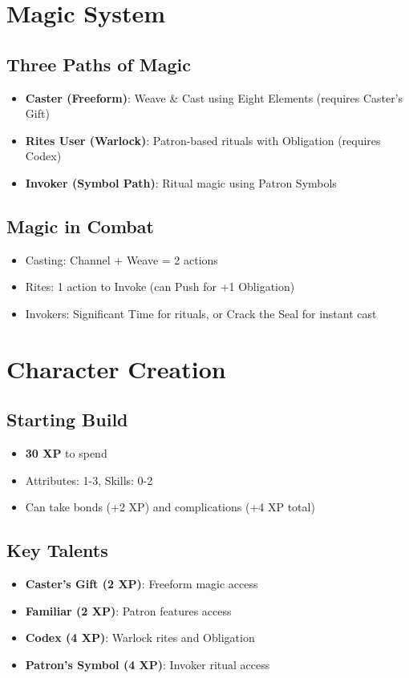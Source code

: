 \documentclass[11pt]{article}
\begin{document}
\section{Magic System}

\subsection{Three Paths of Magic}
\begin{itemize}
    \item \textbf{Caster (Freeform)}: Weave \& Cast using Eight Elements (requires Caster's Gift)
    \item \textbf{Rites User (Warlock)}: Patron-based rituals with Obligation (requires Codex)
    \item \textbf{Invoker (Symbol Path)}: Ritual magic using Patron Symbols
\end{itemize}

\subsection{Magic in Combat}
\begin{itemize}
    \item Casting: Channel + Weave = 2 actions
    \item Rites: 1 action to Invoke (can Push for +1 Obligation)
    \item Invokers: Significant Time for rituals, or Crack the Seal for instant cast
\end{itemize}

\section{Character Creation}

\subsection{Starting Build}
\begin{itemize}
    \item \textbf{30 XP} to spend
    \item Attributes: 1-3, Skills: 0-2
    \item Can take bonds (+2 XP) and complications (+4 XP total)
\end{itemize}

\subsection{Key Talents}
\begin{itemize}
    \item \textbf{Caster's Gift (2 XP)}: Freeform magic access
    \item \textbf{Familiar (2 XP)}: Patron features access
    \item \textbf{Codex (4 XP)}: Warlock rites and Obligation
    \item \textbf{Patron's Symbol (4 XP)}: Invoker ritual access
\end{itemize}
\end{document}
